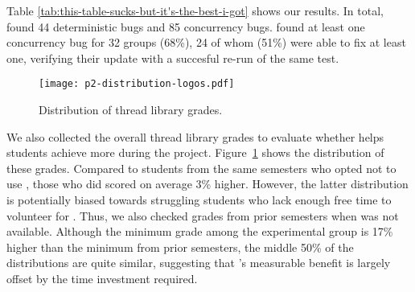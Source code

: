 Table \ref{tab:this-table-sucks-but-it's-the-best-i-got} shows our results.
In total, \landslide found 44 deterministic bugs and 85 concurrency bugs.
\landslide found at least one concurrency bug for 32 groups (68\%),
24 of whom (51\%) were able to fix at least one,
verifying their update with a succesful re-run of the same test.

\begin{figure}[t]
	\texttt{[image: p2-distribution-logos.pdf]}
	\caption{Distribution of thread library grades.}
	\label{fig:p2-distribution}
\end{figure}
We also collected the overall thread library grades to evaluate whether \landslide helps students achieve more during the project.
Figure~\ref{fig:p2-distribution} shows the distribution of these grades.
Compared to students from the same semesters who opted not to use \landslide,
those who did scored on average 3\% higher. %
%
However, the latter distribution is potentially biased towards struggling students
who lack enough free time to volunteer for \landslide.
Thus, we also checked grades from prior semesters when \landslide was not available.
Although the minimum grade among the experimental group is 17\% higher than the minimum from prior semesters,
the middle 50\% of the distributions are quite similar,
suggesting that \landslide's measurable benefit is largely offset by the time investment required.
%
